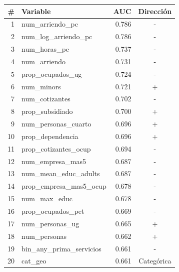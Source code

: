 
\begin{tabular}[t]{rlrc}
\toprule
\# & Variable & AUC & Dirección\\
\midrule
1 & num\_arriendo\_pc & 0.786 & -\\
2 & num\_log\_arriendo\_pc & 0.786 & -\\
3 & num\_horas\_pc & 0.737 & -\\
4 & num\_arriendo & 0.731 & -\\
5 & prop\_ocupados\_ug & 0.724 & -\\
6 & num\_minors & 0.721 & +\\
7 & num\_cotizantes & 0.702 & -\\
8 & prop\_subsidiado & 0.700 & +\\
9 & num\_personas\_cuarto & 0.696 & +\\
10 & prop\_dependencia & 0.696 & +\\
11 & prop\_cotizantes\_ocup & 0.694 & -\\
12 & num\_empresa\_mas5 & 0.687 & -\\
13 & num\_mean\_educ\_adults & 0.687 & -\\
14 & prop\_empresa\_mas5\_ocup & 0.678 & -\\
15 & num\_max\_educ & 0.678 & -\\
16 & prop\_ocupados\_pet & 0.669 & -\\
17 & num\_personas\_ug & 0.665 & +\\
18 & num\_personas & 0.662 & +\\
19 & bin\_any\_prima\_servicios & 0.661 & -\\
20 & cat\_geo & 0.661 & Categórica\\
\bottomrule
\end{tabular}

